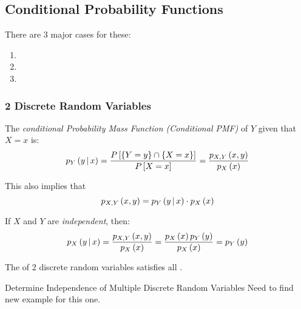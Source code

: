 		\subsection{Conditional Probability Functions} \label{subsec:Multiple Variable Conditional Probability Functions}
		There are 3 major cases for these:
			\begin{enumerate}
				\item {}
				\item {}
				\item {}
			\end{enumerate}

			\subsubsection{2 Discrete Random Variables} \label{subsubsec:2 Discrete Random Variables}
				\begin{definition} \label{def:2 Discrete-Conditional PMF}
					The \emph{conditional Probability Mass Function (Conditional PMF)} of $Y$ given that $X=x$ is:
					\begin{equation} \label{eq:2 Discrete-Conditional PMF}
						p_{Y} \left( y \operatorname{\vert} x \right)
							= \frac{P \left[ \lbrace Y=y \rbrace \cap \lbrace X=x \rbrace \right]}{P \left[ X=x \right]}
							= \frac{p_{X,Y} \left( x,y \right)}{p_{X} \left( x \right)}
					\end{equation}
					\begin{remark}
						This also implies that
						\begin{equation} \label{eq:2 Discrete-Joint PMF}
							p_{X,Y} \left( x,y \right) = p_{Y} \left( y \operatorname{\vert} x \right) \cdot p_{X} \left( x \right)
						\end{equation}
					\end{remark}
					\begin{remark}
						If $X$ and $Y$ are \emph{independent}, then:
						\begin{equation} \label{eq:2 Discrete-Independent Conditional PMF}
							p_{X} \left( y \operatorname{\vert} x \right)
							= \frac{p_{X,Y} \left( x,y \right)}{p_{X} \left( x \right)}
							= \frac{p_{X} \left( x \right) p_{Y} \left( y \right)}{p_{X} \left( x \right)}
							= p_{Y} \left( y \right)
						\end{equation}
					\end{remark}
					\begin{remark}
						The  of 2 discrete random variables satisfies all .
					\end{remark}
				\end{definition}
				\begin{example}[Problem 5.75]{Determine Independence of Multiple Discrete Random Variables}
                                  Need to find new example for this one.
				\end{example}

